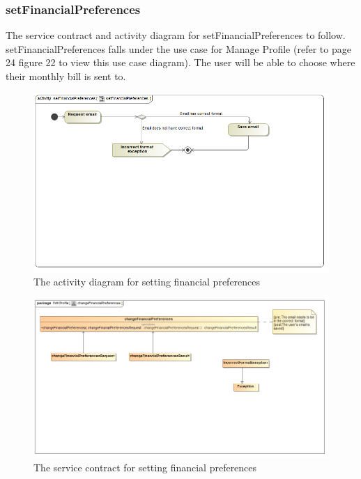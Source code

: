 \documentclass[a4paper,12pt]{report}
\begin{document}
\subsubsection{setFinancialPreferences}
The service contract and activity diagram for setFinancialPreferences to follow. setFinancialPreferences falls under the use case for Manage Profile (refer to page 24 figure 22 to view this use case diagram). The user will be able to choose where their monthly bill  is sent to.
\begin{figure}[H]
  \centering
    \includegraphics[width=1.0\textwidth]{../Diagrams/ManageProfile/ActivityDiagrams/setFinancialPreferences1.png}
    \caption{The activity diagram for setting financial preferences} 
\end{figure}

\begin{figure}[H]
	\centering
	\includegraphics[width=1.0\textwidth]{../Diagrams/ManageProfile/serviceContracts/changeFinancialPreferencesServiceContract.png}
	\caption{The service contract for setting financial preferences}
\end{figure}
\end{document}
